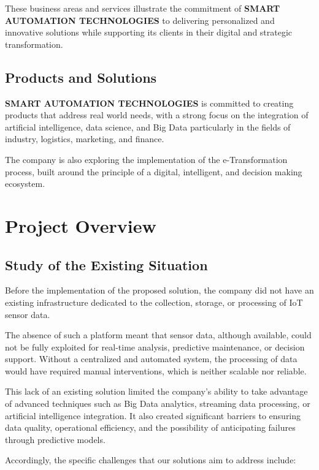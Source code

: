 These business areas and services illustrate the commitment of
\textbf{SMART AUTOMATION TECHNOLOGIES} to delivering personalized and
innovative solutions while supporting its clients in their digital and strategic
transformation.

\subsection{Products and Solutions}
\textbf{SMART AUTOMATION TECHNOLOGIES} is committed to creating
products that address real world needs, with a strong focus on the integration
of artificial intelligence, data science, and Big Data particularly in the
fields of industry, logistics, marketing, and finance.  

The company is also exploring the implementation of the e-Transformation
process, built around the principle of a digital, intelligent, and decision making
ecosystem.  

\section{Project Overview}
\subsection{Study of the Existing Situation}
\hspace{1em}Before the implementation of the proposed solution, the company did not have
an existing infrastructure dedicated to the collection, storage, or processing of
IoT sensor data.  

The absence of such a platform meant that sensor data, although available, could
not be fully exploited for real-time analysis, predictive maintenance, or decision
support. Without a centralized and automated system, the processing of data
would have required manual interventions, which is neither
scalable nor reliable.  

This lack of an existing solution limited the company’s ability to take advantage
of advanced techniques such as Big Data analytics, streaming data processing, or
artificial intelligence integration. It also created significant barriers to ensuring
data quality, operational efficiency, and the possibility of anticipating failures
through predictive models.  

Accordingly, the specific challenges that our solutions aim to address include:  

